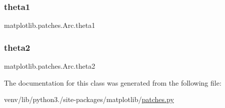 \subsubsection{\texorpdfstring{theta1}{theta1}}
{\footnotesize\ttfamily matplotlib.\+patches.\+Arc.\+theta1}

\mbox{\label{classmatplotlib_1_1patches_1_1Arc_aa51cfe8105d94d19d218334c562fc00d}} 
\subsubsection{\texorpdfstring{theta2}{theta2}}
{\footnotesize\ttfamily matplotlib.\+patches.\+Arc.\+theta2}



The documentation for this class was generated from the following file\+:\begin{DoxyCompactItemize}
\item 
venv/lib/python3./site-\/packages/matplotlib/\hyperlink{patches_8py}{patches.\+py}\end{DoxyCompactItemize}

